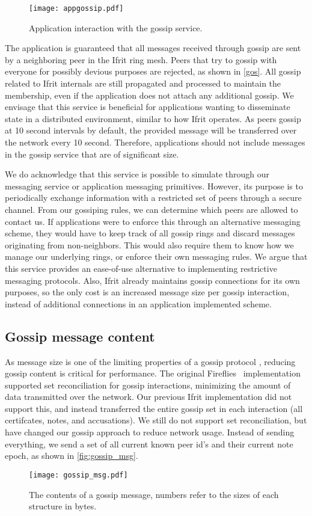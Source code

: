\documentclass[USenglish]{uit-thesis}
\begin{document}
\begin{figure}[h]
	\centering
	\texttt{[image: appgossip.pdf]}
	\caption{Application interaction with the gossip service.}
	\label{fig:appgossip}
\end{figure}

The application is guaranteed that all messages received through gossip are sent by a neighboring peer in the Ifrit ring mesh.
Peers that try to gossip with everyone for possibly devious purposes are rejected, as shown in \autoref{gos}.
All gossip related to Ifrit internals are still propagated and processed to maintain the membership, even if the application does not attach any additional gossip. 
We envisage that this service is beneficial for applications wanting to disseminate state in a distributed environment, similar to how Ifrit operates.
As peers gossip at 10 second intervals by default, the provided message will be transferred over the network every 10 second.
Therefore, applications should not include messages in the gossip service that are of significant size.

We do acknowledge that this service is possible to simulate through our messaging service or application messaging primitives.
However, its purpose is to periodically exchange information with a restricted set of peers through a secure channel.
From our gossiping rules, we can determine which peers are allowed to contact us.
If applications were to enforce this through an alternative messaging scheme, they would have to keep track of all gossip rings and discard messages originating from non-neighbors.
This would also require them to know how we manage our underlying rings, or enforce their own messaging rules.
We argue that this service provides an ease-of-use alternative to implementing restrictive messaging protocols.
Also, Ifrit already maintains gossip connections for its own purposes, so the only cost is an increased message size per gossip interaction, instead of additional connections in an application implemented scheme.


\subsection{Gossip message content}
As message size is one of the limiting properties of a gossip protocol \cite{propa}, reducing gossip content is critical for performance.
The original Fireflies~\cite{flies} implementation supported set reconciliation \cite{set_rec} for gossip interactions, minimizing the amount of data transmitted over the network.
Our previous Ifrit implementation did not support this, and instead transferred the entire gossip set in each interaction (all certifcates, notes, and accusations).
We still do not support set reconciliation, but have changed our gossip approach to reduce network usage.
Instead of sending everything, we send a set of all current known peer id's and their current note epoch, as shown in \autoref{fig:gossip_msg}.
\begin{figure}[h]
	\centering
	\texttt{[image: gossip\_msg.pdf]}
	\caption[Gossip message content.]{The contents of a gossip message, numbers refer to the sizes of each structure in bytes.}
	\label{fig:gossip_msg}
\end{figure}
\end{document}
